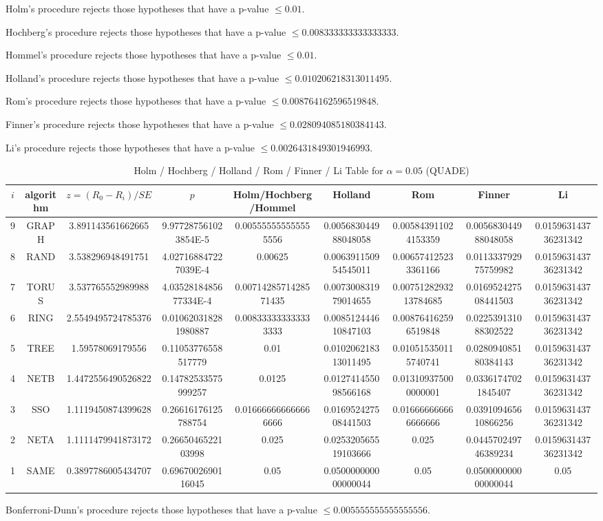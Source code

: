 \documentclass[a4paper,10pt]{article}
\begin{document}
\begin{landscape}
Holm's procedure rejects those hypotheses that have a p-value $\le0.01$.


Hochberg's procedure rejects those hypotheses that have a p-value $\le0.008333333333333333$.


Hommel's procedure rejects those hypotheses that have a p-value $\le0.01$.


Holland's procedure rejects those hypotheses that have a p-value $\le0.010206218313011495$.


Rom's procedure rejects those hypotheses that have a p-value $\le0.008764162596519848$.


Finner's procedure rejects those hypotheses that have a p-value $\le0.028094085180384143$.


Li's procedure rejects those hypotheses that have a p-value $\le0.0026431849301946993$.



\newpage

\begin{table}[!htp]
\centering\scriptsize
\caption{Holm / Hochberg / Holland / Rom / Finner / Li Table for $\alpha=0.05$ (QUADE)}
\begin{tabular}{ccccccccc}
$i$&algorithm&$z=(R_0 - R_i)/SE$&$p$&Holm/Hochberg/Hommel&Holland&Rom&Finner&Li\\
\hline
9& GRAPH&3.891143561662665&9.977287561023854E-5&0.005555555555555556&0.005683044988048058&0.005843911024153359&0.005683044988048058&0.015963143736231342\\
8& RAND&3.538296948491751&4.027168847227039E-4&0.00625&0.006391150954545011&0.006574125233361166&0.011333792975759982&0.015963143736231342\\
7& TORUS&3.537765552989988&4.0352818485677334E-4&0.0071428571428571435&0.007300831979014655&0.0075128293213784685&0.016952427508441503&0.015963143736231342\\
6& RING&2.5549495724785376&0.010620318281980887&0.008333333333333333&0.008512444610847103&0.008764162596519848&0.022539131088302522&0.015963143736231342\\
5& TREE&1.59578069179556&0.11053776558517779&0.01&0.010206218313011495&0.010515350115740741&0.028094085180384143&0.015963143736231342\\
4& NETB&1.4472556490526822&0.14782533575999257&0.0125&0.012741455098566168&0.013109375000000001&0.03361747021845407&0.015963143736231342\\
3& SSO&1.1119450874399628&0.26616176125788754&0.016666666666666666&0.016952427508441503&0.016666666666666666&0.039109465610866256&0.015963143736231342\\
2& NETA&1.1111479941873172&0.2665046522103998&0.025&0.025320565519103666&0.025&0.044570249746389234&0.015963143736231342\\
1& SAME&0.3897786005434707&0.6967002690116045&0.05&0.050000000000000044&0.05&0.050000000000000044&0.05\\
\hline
\end{tabular}
\end{table}
Bonferroni-Dunn's procedure rejects those hypotheses that have a p-value $\le0.005555555555555556$.



\end{landscape}
\end{document}
